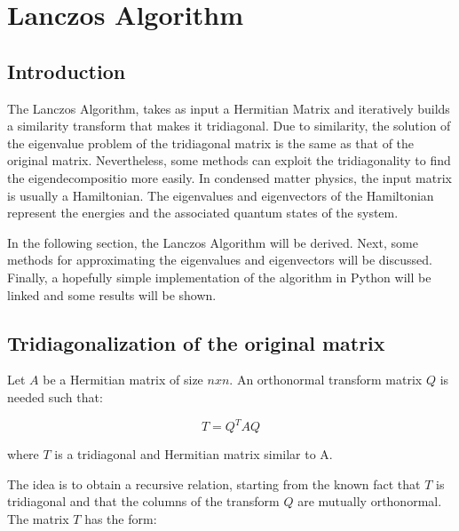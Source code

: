 \section{Lanczos Algorithm}

\subsection{Introduction}

The Lanczos Algorithm, takes as input a Hermitian Matrix and iteratively builds a similarity transform that makes it tridiagonal. Due to similarity, the solution of the eigenvalue problem of the tridiagonal matrix is the same as that of the original matrix. Nevertheless, some methods can exploit the tridiagonality to find the eigendecompositio more easily. In condensed matter physics, the input matrix is usually a Hamiltonian. The eigenvalues and eigenvectors of the Hamiltonian represent the energies and the associated quantum states of the system. 

In the following section, the Lanczos Algorithm will be derived. Next, some methods for approximating the eigenvalues and eigenvectors will be discussed. Finally, a hopefully simple implementation of the algorithm in Python will be linked and some results will be shown.

\subsection{Tridiagonalization of the original matrix}

Let $A$ be a Hermitian matrix of size $nxn$. An orthonormal transform matrix $Q$ is needed such that:

\[ T = Q^{T}AQ \]

where $T$ is a tridiagonal and Hermitian matrix similar to A.

The idea is to obtain a recursive relation, starting from the known fact that $T$ is tridiagonal and that the columns of the transform $Q$ are mutually orthonormal. The matrix $T$ has the form:

